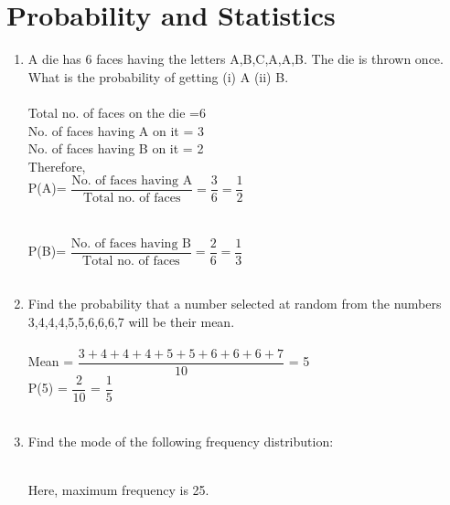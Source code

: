 \documentclass[journal,12pt,twocolumn]{IEEEtran}
\renewcommand\thesection{\arabic{section}}
\begin{document}
\section{Probability and Statistics}
\renewcommand{\theequation}{\theenumi}
\begin{enumerate}[label=\thesection.\arabic*.,ref=\thesection.\theenumi]
\item A die has 6 faces having the letters A,B,C,A,A,B. The die is thrown once. What is the probability of getting (i) A (ii) B.\\ 
\solution \\
Total no. of faces on the die =6 \\
No. of faces having A on it = 3 \\
No. of faces having B on it = 2\\ 
Therefore, \\
P(A)=  $\dfrac{\text{No. of faces having A}}{\text{Total no. of faces}} = \dfrac{3}{6} = \dfrac{1}{2}$ \\ \\ \\
P(B)=  $\dfrac{\text{No. of faces having B}}{\text{Total no. of faces}} = \dfrac{2}{6} = \dfrac{1}{3}$ \\ \\
\item Find the probability that a number selected at random from the numbers 3,4,4,4,5,5,6,6,6,7 will be their mean.\\
\solution \\
Mean = $\dfrac{3+4+4+4+5+5+6+6+6+7}{10}$ = 5\\
P(5) = $\dfrac{2}{10}$ = $\dfrac{1}{5}$\\ \\
\item Find the mode of the following frequency distribution:\\
\begin{table}[ht]
 \centering
 \caption{}
 \end{table} \\
\solution 
Here, maximum frequency is 25.\\

\end{enumerate}
\end{document}
